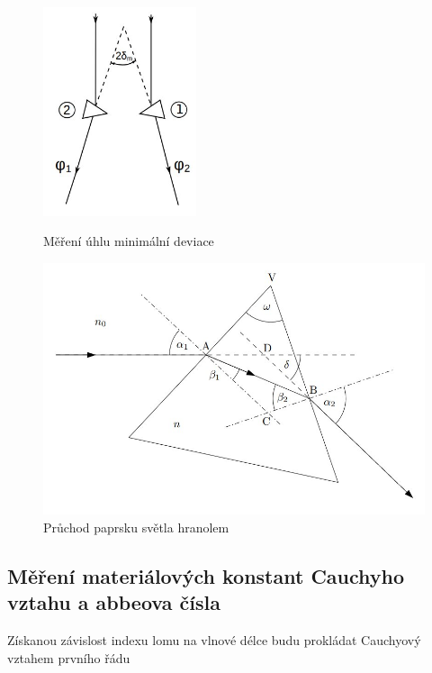 \documentclass[a4paper,11pt]{article}
\begin{document}
\begin{figure}
    \hfill
    \begin{minipage}[b]{.45\linewidth}
        \centering
        \includegraphics[width=0.4\textwidth]{mereni_minimalni_deviace.jpg}
        \caption{Měření úhlu minimální deviace}
    \end{minipage} 
    \hfill
    \begin{minipage}[b]{.45\linewidth}
        \centering
        \includegraphics[width=\textwidth]{pruchod.jpg}
        \caption{Průchod paprsku světla hranolem}
    \end{minipage} 
    \hfill
\end{figure}

\subsection{Měření materiálových konstant Cauchyho vztahu a abbeova čísla}

Získanou závislost indexu lomu na vlnové délce budu prokládat Cauchyový vztahem prvního řádu
\end{document}
